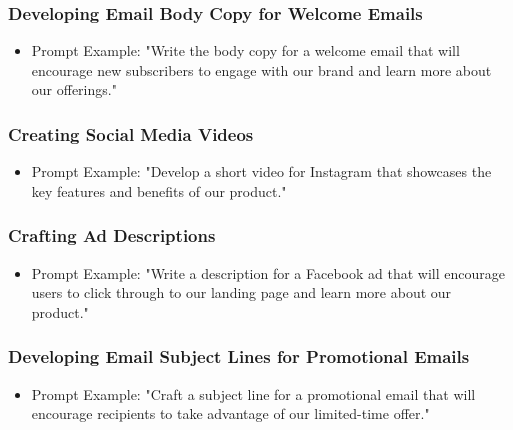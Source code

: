 \begin{frame}[fragile]\frametitle{Developing Email Body Copy for Welcome Emails}
\begin{itemize}
\item Prompt Example: "Write the body copy for a welcome email that will encourage new subscribers to engage with our brand and learn more about our offerings."
\end{itemize}
\end{frame}

\begin{frame}[fragile]\frametitle{Creating Social Media Videos}
\begin{itemize}
\item Prompt Example: "Develop a short video for Instagram that showcases the key features and benefits of our product."
\end{itemize}
\end{frame}

\begin{frame}[fragile]\frametitle{Crafting Ad Descriptions}
\begin{itemize}
\item Prompt Example: "Write a description for a Facebook ad that will encourage users to click through to our landing page and learn more about our product."
\end{itemize}
\end{frame}

\begin{frame}[fragile]\frametitle{Developing Email Subject Lines for Promotional Emails}
\begin{itemize}
\item Prompt Example: "Craft a subject line for a promotional email that will encourage recipients to take advantage of our limited-time offer."
\end{itemize}
\end{frame}